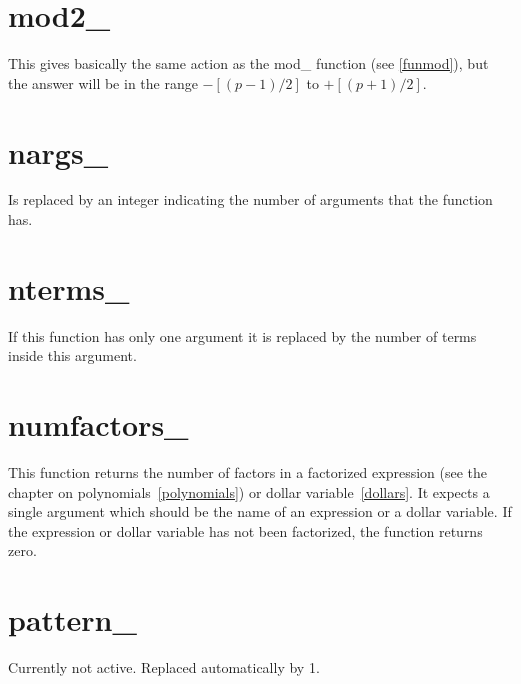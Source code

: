 \section{mod2\_}
\label{funmod2}
\noindent This gives basically the same action as the mod\_ function (see 
\ref{funmod}), but the answer will be in the range $-[(p-1)/2]$ to 
$+[(p+1)/2]$.


\section{nargs\_}
\label{funnargs}
\noindent Is replaced by an integer indicating the number of 
arguments that the function has.


\section{nterms\_}
\label{funnterms}
\noindent If this function has only one argument it is replaced by 
the number of terms inside this argument.


\section{numfactors\_}
\label{funnumfactors}

\noindent This function returns the number of factors in a factorized 
expression (see the chapter on polynomials~\ref{polynomials}) or dollar 
variable~\ref{dollars}. It expects a single argument which should be the 
name of an expression or a dollar variable. If the expression or dollar 
variable has not been factorized, the function returns zero.


\section{pattern\_}
\label{funpattern}
\noindent Currently not active. Replaced automatically by 1.


